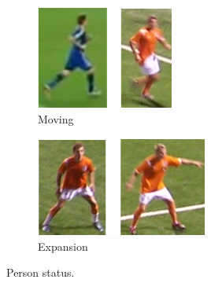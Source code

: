 \begin{figure}[thb]
\begin{subfigure}[b]{0.127\textwidth}
                \includegraphics[width=\linewidth]{figure/move1.png}
                \caption{Moving}
                \label{fig:gull2}
        \end{subfigure}\quad
        \begin{subfigure}[b]{0.166\textwidth}
                \includegraphics[width=\linewidth]{figure/expand1.png}
                \caption{Expansion}
                \label{fig:tiger}
        \end{subfigure}
        \caption{Person status.}\label{fig:Person Status}
\end{figure}




